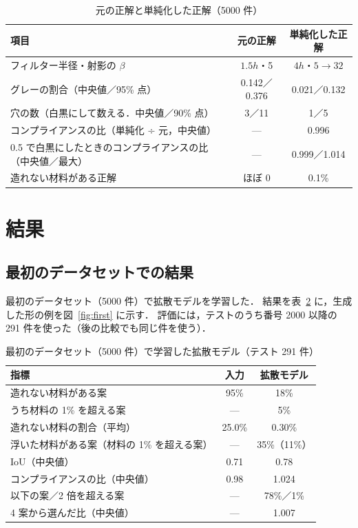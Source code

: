 \documentclass[a4paper,11pt]{ltjsarticle}
\begin{document}
\begin{table}[tb]
  \centering
  \caption{元の正解と単純化した正解（5000 件）}
  \label{tab:simplify}
  \begin{tabular}{lcc}
    \toprule
    項目 & 元の正解 & 単純化した正解 \\
    \midrule
    フィルター半径・射影の $\beta$ & $1.5h$・5 & $4h$・$5 \to 32$ \\
    グレーの割合（中央値／95\% 点） & 0.142／0.376 & 0.021／0.132 \\
    穴の数（白黒にして数える．中央値／90\% 点） & 3／11 & 1／5 \\
    コンプライアンスの比（単純化 ÷ 元，中央値） & --- & 0.996 \\
    0.5 で白黒にしたときのコンプライアンスの比（中央値／最大） & --- & 0.999／1.014 \\
    造れない材料がある正解 & ほぼ 0 & 0.1\% \\
    \bottomrule
  \end{tabular}
\end{table}

\section{結果}

\subsection{最初のデータセットでの結果}
\label{sec:first}

最初のデータセット（5000 件）で拡散モデルを学習した．
結果を表~\ref{tab:first} に，生成した形の例を図~\ref{fig:first} に示す．
評価には，テストのうち番号 2000 以降の 291 件を使った（後の比較でも同じ件を使う）．

\begin{table}[tb]
  \centering
  \caption{最初のデータセット（5000 件）で学習した拡散モデル（テスト 291 件）}
  \label{tab:first}
  \begin{tabular}{lcc}
    \toprule
    指標 & 入力 & 拡散モデル \\
    \midrule
    造れない材料がある案 & 95\% & 18\% \\
    \quad うち材料の 1\% を超える案 & --- & 5\% \\
    造れない材料の割合（平均） & 25.0\% & 0.30\% \\
    浮いた材料がある案（材料の 1\% を超える案） & --- & 35\%（11\%） \\
    IoU（中央値） & 0.71 & 0.78 \\
    コンプライアンスの比（中央値） & 0.98 & 1.024 \\
    \quad 1.05 以下の案／2 倍を超える案 & --- & 78\%／1\% \\
    4 案から選んだ比（中央値） & --- & 1.007 \\
    \bottomrule
  \end{tabular}
\end{table}
\end{document}
